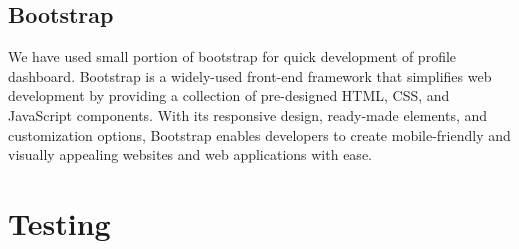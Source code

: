 \subsection{Bootstrap}
We have used small portion of bootstrap for quick development of profile dashboard. Bootstrap is a widely-used front-end framework that simplifies web development by providing a collection of pre-designed HTML, CSS, and JavaScript components. With its responsive design, ready-made elements, and customization options, Bootstrap enables developers to create mobile-friendly and visually appealing websites and web applications with ease.
\section{Testing}
